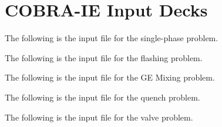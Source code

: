 \chapter{COBRA-IE Input Decks}
\label{app:input_decks}

The following is the \cobra{} input file for the single-phase problem.
\singlespace
{\small }

\pagebreak
The following is the \cobra{} input file for the flashing problem.
{\small }

\pagebreak
The following is the \cobra{} input file for the GE Mixing problem.
{\small }

\pagebreak
The following is the \cobra{} input file for the quench problem.
{\small }

\pagebreak
The following is the \cobra{} input file for the valve problem.
{\small }